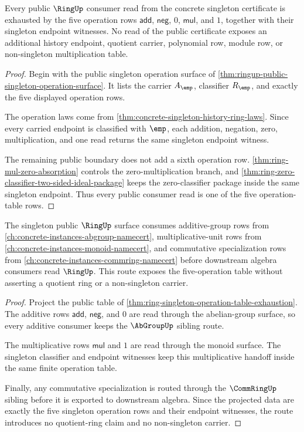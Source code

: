 \begin{theorem}
\label{thm:ring-singleton-operation-table-exhaustion}
Every public $\RingUp$ consumer read from the concrete singleton certificate is
exhausted by the five operation rows
$\mathsf{add}$, $\mathsf{neg}$, $0$, $\mathsf{mul}$, and $1$, together with
their singleton endpoint witnesses. No read of the public certificate exposes
an additional history endpoint, quotient carrier, polynomial row, module row,
or non-singleton multiplication table.
\end{theorem}
\begin{proof}
Begin with the public singleton operation surface of
\autoref{thm:ringup-public-singleton-operation-surface}. It lists the carrier
$A_{\emp}$, classifier $R_{\emp}$, and exactly the five displayed operation
rows.

The operation laws come from
\autoref{thm:concrete-singleton-history-ring-laws}. Since every carried
endpoint is classified with $\emp$, each addition, negation, zero,
multiplication, and one read returns the same singleton endpoint witness.

The remaining public boundary does not add a sixth operation row.
\autoref{thm:ring-mul-zero-absorption} controls the zero-multiplication branch,
and \autoref{thm:ring-zero-classifier-two-sided-ideal-package} keeps the
zero-classifier package inside the same singleton endpoint. Thus every public
consumer read is one of the five operation-table rows.
\end{proof}

\begin{theorem}
\label{thm:ringup-algebra-sibling-route}
The singleton public $\RingUp$ surface consumes additive-group rows from
\autoref{ch:concrete-instances-abgroup-namecert}, multiplicative-unit rows
from \autoref{ch:concrete-instances-monoid-namecert}, and commutative
specialization rows from \autoref{ch:concrete-instances-commring-namecert}
before downstream algebra consumers read $\RingUp$. This route exposes the
five-operation table without asserting a quotient ring or a non-singleton
carrier.
\end{theorem}
\begin{proof}
Project the public table of
\autoref{thm:ring-singleton-operation-table-exhaustion}. The additive rows
$\mathsf{add}$, $\mathsf{neg}$, and $0$ are read through the abelian-group
surface, so every additive consumer keeps the $\AbGroupUp$ sibling route.

The multiplicative rows $\mathsf{mul}$ and $1$ are read through the monoid
surface. The singleton classifier and endpoint witnesses keep this
multiplicative handoff inside the same finite operation table.

Finally, any commutative specialization is routed through the
$\CommRingUp$ sibling before it is exported to downstream algebra. Since the
projected data are exactly the five singleton operation rows and their
endpoint witnesses, the route introduces no quotient-ring claim and no
non-singleton carrier.
\end{proof}

